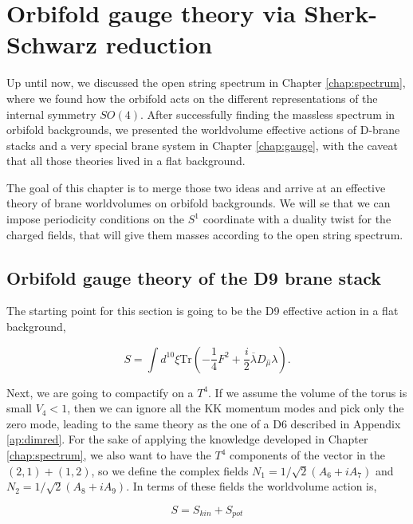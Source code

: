 
\chapter{Orbifold gauge theory via Sherk-Schwarz reduction}
\label{chap:ss_red}
\pagestyle{fancy}

Up until now, we discussed the open string spectrum in Chapter \ref{chap:spectrum}, where we found how the orbifold acts on the different representations of the internal symmetry $SO(4)$. After successfully finding the massless spectrum in orbifold backgrounds, we presented the worldvolume effective actions of D-brane stacks and a very special brane system in Chapter \ref{chap:gauge}, with the caveat that all those theories lived in a flat background.

The goal of this chapter is to merge those two ideas and arrive at an effective theory of brane worldvolumes on orbifold backgrounds. We will se that we can impose periodicity conditions on the $S^1$ coordinate with a duality twist for the charged fields, that will give them masses according to the open string spectrum.

\section{Orbifold gauge theory of the D9 brane stack}

The starting point for this section is going to be the D9 effective action in a flat background,

\begin{equation}
    S = \int d^{10}\xi \text{Tr} \left( -\frac{1}{4} F^2 + \frac{i}{2} \overline{\lambda} D_{\hat{\mu}} \lambda\right).
\end{equation}

Next, we are going to compactify on a $T^4$. If we assume the volume of the torus is small $V_4 < 1$, then we can ignore all the KK momentum modes and pick only the zero mode, leading to the same theory as the one of a D6 described in Appendix \ref{ap:dimred}. For the sake of applying the knowledge developed in Chapter \ref{chap:spectrum}, we also want to have the $T^4$ components of the vector in the $(2,1) + (1,2)$, so we define the complex fields $N_1 = 1/\sqrt{2} \left( A_6 + i A_7\right)$ and $N_2 = 1/\sqrt{2} \left( A_8 + i A_9\right)$. In terms of these fields the worldvolume action is,

\begin{equation}
    S = S_{kin} + S_{pot} 
\end{equation}

